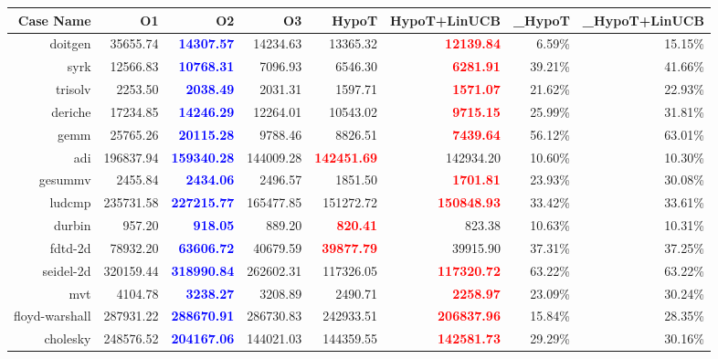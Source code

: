 \documentclass[landscape]{report}
\begin{document}
\begin{longtable}{rrrrrrrr}
\toprule
Case Name	& O1	& O2	& O3	& HypoT	& HypoT+LinUCB	& \Delta_{HypoT}	& \Delta_{HypoT+LinUCB} \\
\midrule
doitgen	& 35655.74	& \textcolor{blue}{\textbf{14307.57}}	& 14234.63	& 13365.32	& \textcolor{red}{\textbf{12139.84}}	& 6.59\%	& 15.15\% \\
syrk	& 12566.83	& \textcolor{blue}{\textbf{10768.31}}	& 7096.93	& 6546.30	& \textcolor{red}{\textbf{6281.91}}	& 39.21\%	& 41.66\% \\
trisolv	& 2253.50	& \textcolor{blue}{\textbf{2038.49}}	& 2031.31	& 1597.71	& \textcolor{red}{\textbf{1571.07}}	& 21.62\%	& 22.93\% \\
deriche	& 17234.85	& \textcolor{blue}{\textbf{14246.29}}	& 12264.01	& 10543.02	& \textcolor{red}{\textbf{9715.15}}	& 25.99\%	& 31.81\% \\
gemm	& 25765.26	& \textcolor{blue}{\textbf{20115.28}}	& 9788.46	& 8826.51	& \textcolor{red}{\textbf{7439.64}}	& 56.12\%	& 63.01\% \\
adi	& 196837.94	& \textcolor{blue}{\textbf{159340.28}}	& 144009.28	& \textcolor{red}{\textbf{142451.69}}	& 142934.20	& 10.60\%	& 10.30\% \\
gesummv	& 2455.84	& \textcolor{blue}{\textbf{2434.06}}	& 2496.57	& 1851.50	& \textcolor{red}{\textbf{1701.81}}	& 23.93\%	& 30.08\% \\
ludcmp	& 235731.58	& \textcolor{blue}{\textbf{227215.77}}	& 165477.85	& 151272.72	& \textcolor{red}{\textbf{150848.93}}	& 33.42\%	& 33.61\% \\
durbin	& 957.20	& \textcolor{blue}{\textbf{918.05}}	& 889.20	& \textcolor{red}{\textbf{820.41}}	& 823.38	& 10.63\%	& 10.31\% \\
fdtd-2d	& 78932.20	& \textcolor{blue}{\textbf{63606.72}}	& 40679.59	& \textcolor{red}{\textbf{39877.79}}	& 39915.90	& 37.31\%	& 37.25\% \\
seidel-2d	& 320159.44	& \textcolor{blue}{\textbf{318990.84}}	& 262602.31	& 117326.05	& \textcolor{red}{\textbf{117320.72}}	& 63.22\%	& 63.22\% \\
mvt	& 4104.78	& \textcolor{blue}{\textbf{3238.27}}	& 3208.89	& 2490.71	& \textcolor{red}{\textbf{2258.97}}	& 23.09\%	& 30.24\% \\
floyd-warshall	& 287931.22	& \textcolor{blue}{\textbf{288670.91}}	& 286730.83	& 242933.51	& \textcolor{red}{\textbf{206837.96}}	& 15.84\%	& 28.35\% \\
cholesky	& 248576.52	& \textcolor{blue}{\textbf{204167.06}}	& 144021.03	& 144359.55	& \textcolor{red}{\textbf{142581.73}}	& 29.29\%	& 30.16\% \\

\end{longtable}
\end{document}
